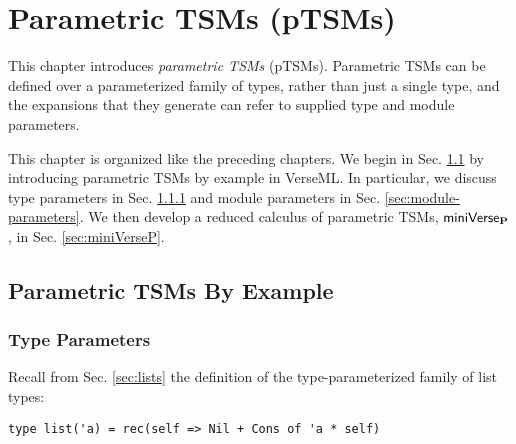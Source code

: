 
\chapter{Parametric TSMs (pTSMs)}\label{chap:ptsms}
This chapter introduces \emph{parametric TSMs} (pTSMs). Parametric TSMs can be defined over a parameterized family of types, rather than just a single type, and the expansions that they generate can refer to  supplied type and module parameters. 

This chapter is organized like the preceding chapters. We begin in Sec. \ref{sec:parameterized-tsms-by-example} by introducing parametric TSMs by example in VerseML. In particular, we discuss type parameters in Sec. \ref{sec:type-parameters} and module parameters in Sec. \ref{sec:module-parameters}. We then develop a reduced calculus of parametric TSMs, $\mathsf{miniVerse}_\textbf{P}$, in Sec. \ref{sec:miniVerseP}.

\section{Parametric TSMs By Example}\label{sec:parameterized-tsms-by-example}

\subsection{Type Parameters}\label{sec:type-parameters}
Recall from Sec. \ref{sec:lists} the definition of the type-parameterized family of list types:
\begin{lstlisting}[numbers=none]
type list('a) = rec(self => Nil + Cons of 'a * self)
\end{lstlisting}


